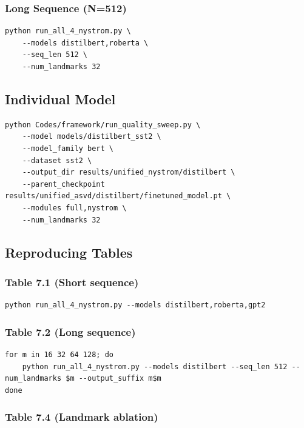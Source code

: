 \subsubsection{Long Sequence (N=512)}

\begin{lstlisting}
python run_all_4_nystrom.py \
    --models distilbert,roberta \
    --seq_len 512 \
    --num_landmarks 32
\end{lstlisting}

\subsection{Individual Model}

\begin{lstlisting}
python Codes/framework/run_quality_sweep.py \
    --model models/distilbert_sst2 \
    --model_family bert \
    --dataset sst2 \
    --output_dir results/unified_nystrom/distilbert \
    --parent_checkpoint results/unified_asvd/distilbert/finetuned_model.pt \
    --modules full,nystrom \
    --num_landmarks 32
\end{lstlisting}

\subsection{Reproducing Tables}

\subsubsection{Table 7.1 (Short sequence)}

\begin{lstlisting}
python run_all_4_nystrom.py --models distilbert,roberta,gpt2
\end{lstlisting}

\subsubsection{Table 7.2 (Long sequence)}

\begin{lstlisting}
for m in 16 32 64 128; do
    python run_all_4_nystrom.py --models distilbert --seq_len 512 --num_landmarks $m --output_suffix m$m
done
\end{lstlisting}

\subsubsection{Table 7.4 (Landmark ablation)}

